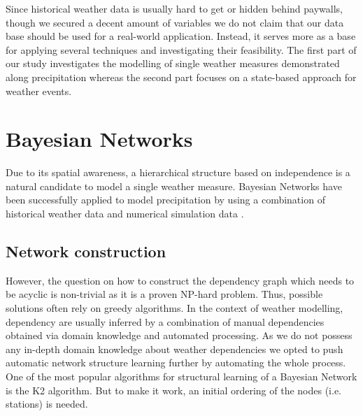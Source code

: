 \documentclass{article}
\begin{document}
Since historical weather data is usually hard to get or hidden behind paywalls, though we secured a decent amount of variables
we do not claim that our data base should be used for a real-world application. Instead, it serves more as a base for applying several techniques and investigating their feasibility. The first part of our study investigates the modelling of single weather measures demonstrated along precipitation whereas the second part focuses on a state-based approach for weather events.
\\
\label{sec:intro}
\section{Bayesian Networks}
Due to its spatial awareness, a hierarchical structure based on independence is a natural candidate to model a single weather measure. Bayesian Networks have been successfully applied to model precipitation by using a combination of historical weather data and numerical simulation data \cite{SpainBN}. 
\subsection{Network construction}
However, the question on how to construct the dependency graph which needs to be acyclic is non-trivial as it is a proven NP-hard problem. Thus, possible solutions often rely on greedy algorithms. In the context of weather modelling, dependency are usually inferred by a combination of manual dependencies obtained via domain knowledge and automated processing. As we do not possess any in-depth domain knowledge about weather dependencies we opted to push automatic network structure learning further by automating the whole process.\\
One of the most popular algorithms for structural learning of a Bayesian Network is the K2 algorithm. But to make it work, an initial ordering of the nodes (i.e. stations) is needed. 
\end{document}
